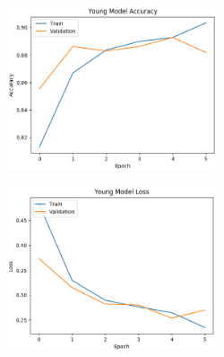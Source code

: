 \documentclass[10pt,twocolumn,letterpaper]{article}
\begin{document}
\begin{figure}[!htbp]
  \begin{subfigure}[t]{.45\linewidth}
    \centering
    \includegraphics[width=\linewidth, height=4.8cm]{Young_model_accuracy.png}
  \end{subfigure}
  \hfill
  \begin{subfigure}[t]{.45\linewidth}
    \centering
    \includegraphics[width=\linewidth, height=4.8cm]{Young_model_loss.png}
  \end{subfigure}


\end{figure}
\end{document}
